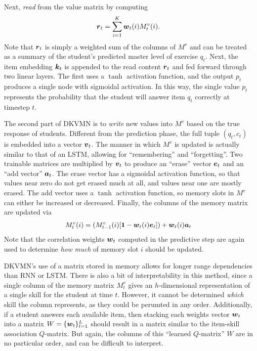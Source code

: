 Next, \textit{read} from the value matrix by computing 
\begin{equation}
  \boldsymbol{r}_t = \sum_{i=1}^K \boldsymbol{w}_t(i) M_t^v(i).
  \label{eq:dkvmn_read}
\end{equation}
Note that $\boldsymbol{r}_t$ is simply a weighted sum of the columns of $M^v$ and can be treated as a summary of the student's predicted master level of exercise $q_t$. Next, the item embedding $\boldsymbol{k}_t$ is appended to the read content $\boldsymbol{r}_t$ and fed forward through two linear layers. The first uses a $\tanh$ activation function, and the output $p_t$ produces a single node with sigmoidal activation. In this way, the single value $p_t$ represents the probability that the student will answer item $q_t$ correctly at timestep $t$.

The second part of DKVMN is to \textit{write} new values into $M^v$ based on the true response of students. Different from the prediction phase, the full tuple $(q_t,c_t)$ is embedded into a vector $\boldsymbol{v}_t$. The manner in which $M^v$ is updated is actually similar to that of an LSTM, allowing for ``remembering'' and ``forgetting''. Two trainable matrices are multiplied by $\boldsymbol{v}_t$ to produce an ``erase'' vector $\boldsymbol{e}_t$ and an ``add vector'' $\boldsymbol{a}_t$. The erase vector has a sigmoidal activation function, so that values near zero do not get erased much at all, and values near one are mostly erased. The add vector uses a $\tanh$ activation function, so memory slots in $M^v$ can either be increased or decreased. Finally, the columns of the memory matrix are updated via
\begin{equation}
  M_{t}^v(i) = (M_{t-1}^v(i) [\boldsymbol{1} - \boldsymbol{w}_t(i) \boldsymbol{e}_t] ) + \boldsymbol{w}_t(i) \boldsymbol{a}_t
  \label{eq:update_dkvmn}
\end{equation}
Note that the correlation weights $\boldsymbol{w}_t$ computed in the predictive step are again used to determine \textit{how much} of memory slot $i$ should be updated.

DKVMN's use of a matrix stored in memory allows for longer range dependencies than RNN or LSTM. There is also a bit of interpretability in this method, since a single column of the memory matrix $M_t^v$ gives an $h$-dimensional representation of a single skill for the student at time $t$. However, it cannot be determined \textit{which} skill the column represents, as they could be perumted in any order. Additionally, if a student answers each available item, then stacking each weights vector $\boldsymbol{w}_t$ into a matrix $W = \{\boldsymbol{w}_t\}_{t=1}^L$ should result in a matrix similar to the item-skill association $Q$-matrix. But again, the columns of this ``learned $Q$-matrix'' $W$ are in no particular order, and can be difficult to interpret.

